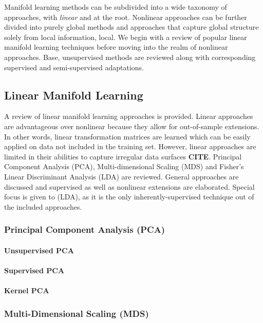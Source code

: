 Manifold learning methods can be subdivided into a wide taxonomy of approaches, with \textit{linear} and  at the root. Nonlinear approaches can be further divided into purely global methods and approaches that capture global structure solely from local information, local.  We begin with a review of popular linear manifold learning techniques before moving into the realm of nonlinear approaches. Base, unsupervised methods are reviewed along with corresponding supervised and semi-supervised adaptations. 

\subsection{Linear Manifold Learning}
A review of linear manifold learning approaches is provided.  Linear approaches are advantageous over nonlinear because they allow for out-of-sample extensions.  In other words, linear transformation matrices are learned which can be easily applied on data not included in the training set.  However, linear approaches are limited in their abilities to capture irregular data surfaces \textbf{CITE}.  Principal Component Analysis (PCA), Multi-dimensional Scaling (MDS) and Fisher's Linear Discriminant Analysis (LDA) are reviewed.  General approaches are discussed and supervised as well as nonlinear extensions are elaborated. Special focus is given to (LDA), as it is the only inherently-supervised technique out of the included approaches.

\subsubsection{Principal Component Analysis (PCA)}

\paragraph{Unsupervised PCA}

\paragraph{Supervised PCA}

\paragraph{Kernel PCA}

\subsubsection{Multi-Dimensional Scaling (MDS)}


